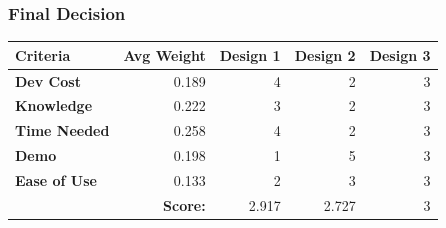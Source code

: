 \documentclass[12pt]{article}
\newcommand\cellhead[1]{\cellcolor{lightgray}\textbf{ #1 }}
\begin{document}
            \subsubsection{Final Decision}
                \begin{center}\begin{tabular}{|l|r|r|r|r|}
                    \hline
                    \cellhead{Criteria} & \cellhead{Avg Weight} & \cellhead{Design 1} & \cellhead{Design 2} & \cellhead{Design 3} \\\hline
                    \cellhead{Dev Cost} & 0.189 & 4 & 2 & 3 \\\hline
                    \cellhead{Knowledge} & 0.222 & 3 & 2 & 3 \\\hline
                    \cellhead{Time Needed} & 0.258 & 4 & 2 & 3 \\\hline
                    \cellhead{Demo} & 0.198 & 1 & 5 & 3 \\\hline
                    \cellhead{Ease of Use} & 0.133 & 2 & 3 & 3 \\\hline
                    & \cellhead{Score:} & 2.917 & 2.727 & 3 \\\hline
                \end{tabular}\end{center}
        
\end{document}
